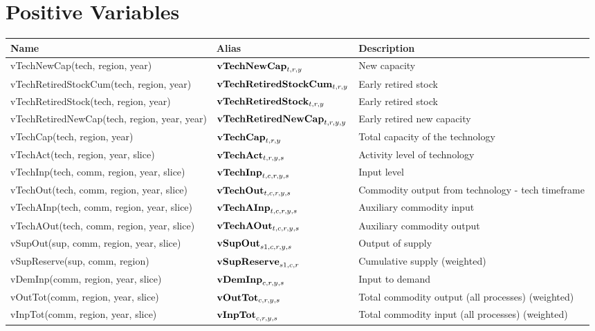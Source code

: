 \documentclass{article}
\begin{document}
\section*{Positive Variables}
\begin{longtable}{|p{10cm}|p{5cm}|p{9cm}|}
\hline
\bf{Name} & \bf{Alias}   & \bf{Description} \\
 \hline
vTechNewCap(tech, region, year) & ${\bf vTechNewCap}_{t,r,y}$ & New capacity \\
 \hline
vTechRetiredStockCum(tech, region, year) & ${\bf vTechRetiredStockCum}_{t,r,y}$ & Early retired stock \\
 \hline
vTechRetiredStock(tech, region, year) & ${\bf vTechRetiredStock}_{t,r,y}$ & Early retired stock \\
 \hline
vTechRetiredNewCap(tech, region, year, year) & ${\bf vTechRetiredNewCap}_{t,r,y,y}$ & Early retired new capacity \\
 \hline
vTechCap(tech, region, year) & ${\bf vTechCap}_{t,r,y}$ & Total capacity of the technology \\
 \hline
vTechAct(tech, region, year, slice) & ${\bf vTechAct}_{t,r,y,s}$ & Activity level of technology \\
 \hline
vTechInp(tech, comm, region, year, slice) & ${\bf vTechInp}_{t,c,r,y,s}$ & Input level \\
 \hline
vTechOut(tech, comm, region, year, slice) & ${\bf vTechOut}_{t,c,r,y,s}$ & Commodity output from technology - tech timeframe \\
 \hline
vTechAInp(tech, comm, region, year, slice) & ${\bf vTechAInp}_{t,c,r,y,s}$ & Auxiliary commodity input \\
 \hline
vTechAOut(tech, comm, region, year, slice) & ${\bf vTechAOut}_{t,c,r,y,s}$ & Auxiliary commodity output \\
 \hline
vSupOut(sup, comm, region, year, slice) & ${\bf vSupOut}_{s1,c,r,y,s}$ & Output of supply \\
 \hline
vSupReserve(sup, comm, region) & ${\bf vSupReserve}_{s1,c,r}$ & Cumulative supply (weighted) \\
 \hline
vDemInp(comm, region, year, slice) & ${\bf vDemInp}_{c,r,y,s}$ & Input to demand \\
 \hline
vOutTot(comm, region, year, slice) & ${\bf vOutTot}_{c,r,y,s}$ & Total commodity output (all processes) (weighted) \\
 \hline
vInpTot(comm, region, year, slice) & ${\bf vInpTot}_{c,r,y,s}$ & Total commodity input (all processes) (weighted) \\

\end{longtable}
\end{document}
